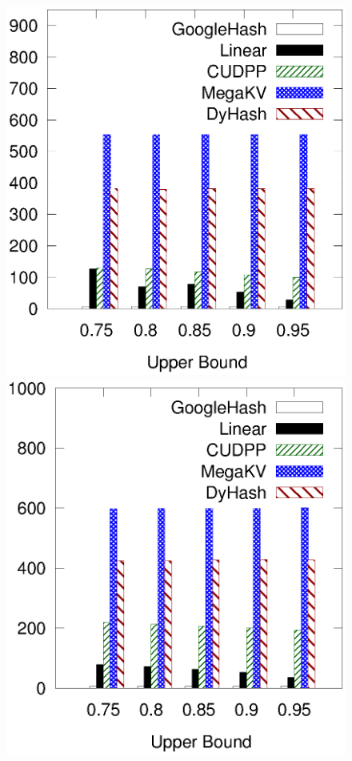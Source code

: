 \begin{figure}[t!]
\begin{minipage}{0.19\linewidth}
		\centerline{\dsreddit}
	\end{minipage}
	\hfill
	\begin{minipage}{0.19\linewidth}\centering
		\includegraphics[width=\linewidth]{pic/static-upper/upper_search_tpch.eps}
		\centerline{\dstpch}
	\end{minipage}
	\hfill
	\begin{minipage}{0.19\linewidth}\centering
		\includegraphics[width=\linewidth]{pic/static-upper/upper_search_ali.eps}

\end{minipage}
\end{figure}
